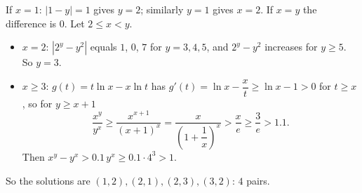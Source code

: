 If $x=1$: $|1-y|=1$ gives $y=2$; similarly $y=1$ gives $x=2$. If $x=y$ the difference is $0$. Let $2\le x<y$.
\begin{itemize}
\item $x=2$: $\left|2^y-y^2\right|$ equals $1$, $0$, $7$ for $y=3,4,5$, and $2^y-y^2$ increases for $y\ge5$. So $y=3$.
\item $x\ge3$: $g(t)=t\ln x-x\ln t$ has $g'(t)=\ln x-\dfrac xt\ge\ln x-1>0$ for $t\ge x$, so for $y\ge x+1$
\[\dfrac{x^y}{y^x}\ge\dfrac{x^{x+1}}{(x+1)^x}=\dfrac{x}{\left(1+\dfrac1x\right)^x}>\dfrac{x}{e}\ge\dfrac3e>1.1.\]
Then $x^y-y^x>0.1\,y^x\ge0.1\cdot4^3>1$.
\end{itemize}
So the solutions are $(1,2),(2,1),(2,3),(3,2)$: $\boxed{4}$ pairs.
